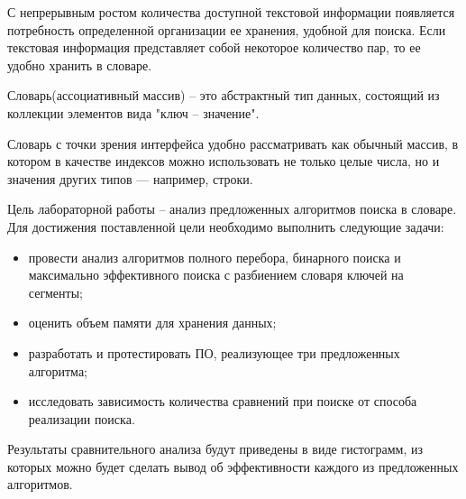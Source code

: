 \setcounter{page}{2}

С непрерывным ростом количества доступной текстовой информации появляется потребность определенной организации ее хранения, удобной для поиска. Если текстовая информация представляет собой некоторое количество пар, то ее удобно хранить в словаре. 

Словарь(ассоциативный массив) -- это абстрактный тип данных, состоящий из коллекции элементов вида "ключ -- значение".  

Словарь с точки зрения интерфейса удобно рассматривать как обычный массив, в котором в качестве индексов можно использовать не только целые числа, но и значения других типов — например, строки.

Цель лабораторной работы -- анализ предложенных алгоритмов поиска в словаре. Для достижения поставленной цели необходимо выполнить следующие задачи:
\begin{itemize}
	\item провести анализ алгоритмов полного перебора, бинарного поиска и максимально эффективного поиска с разбиением словаря ключей на сегменты;
	\item оценить объем памяти для хранения данных;
	\item разработать и протестировать ПО, реализующее три предложенных алгоритма;
	\item исследовать зависимость количества сравнений при поиске от способа реализации поиска.
\end{itemize}
Результаты сравнительного анализа будут приведены в виде гистограмм, из которых можно будет сделать вывод об эффективности каждого из предложенных алгоритмов.